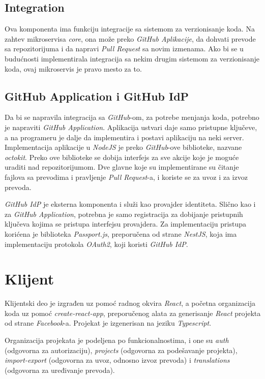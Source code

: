 \subsection{Integration}
Ova komponenta ima funkciju integracije sa sistemom za verzionisanje koda. 
Na zahtev mikroservisa \textit{core}, ona može preko \textit{GitHub Aplikacije}, 
da dohvati prevode sa repozitorijuma i da napravi \textit{Pull Request} sa 
novim izmenama. Ako bi se u budućnosti implementirala integracija sa nekim 
drugim sistemom za verzionisanje koda, ovaj mikroservis je pravo mesto za to.

\subsection{GitHub Application i GitHub IdP}
Da bi se napravila integracija sa \textit{GitHub}-om, za potrebe menjanja 
koda, potrebno je napraviti \textit{GitHub Application}. Aplikacija 
ustvari daje samo pristupne ključeve, a na programeru je dalje da implementira 
i postavi aplikaciju na neki server. Implementacija aplikacije u \textit{NodeJS} 
je preko \textit{GitHub}-ove biblioteke, nazvane \textit{octokit}. Preko ove 
biblioteke se dobija interfejs za sve akcije koje je moguće uraditi nad 
repozitorijumom. Dve glavne koje su implementirane su čitanje fajlova sa 
prevodima i pravljenje \textit{Pull Request}-a, i koriste se za uvoz i za 
izvoz prevoda.

\textit{GitHub IdP} je eksterna komponenta i služi kao provajder identiteta. 
Slično kao i za \textit{GitHub Application}, potrebna je samo registracija 
za dobijanje pristupnih ključeva kojima se pristupa interfejsu provajdera. 
Za implementaciju pristupa korićena je biblioteka \textit{Passport.js}, 
preporučena od strane \textit{NestJS}, koja ima implementaciju 
protokola \textit{OAuth2}, koji koristi \textit{GitHub IdP}.

\section{Klijent}
Klijentski deo je izgrađen uz pomoć radnog okvira \textit{React}, a početna 
organizacija koda uz pomoć \textit{create-react-app}, preporučenog alata za 
generisanje \textit{React} projekta od strane \textit{Facebook}-a. 
Projekat je izgenerisan na jeziku \textit{Typescript}. 

Organizacija projekata je podeljena po funkcionalnostima, i one su 
\textit{auth} (odgovorna za autorizaciju), \textit{projects} (odgovorna za 
podešavanje projekta), \textit{import-export} (odgovorna za 
uvoz, odnosno izvoz prevoda) i \textit{translations} (odgovorna za uređivanje 
prevoda).

